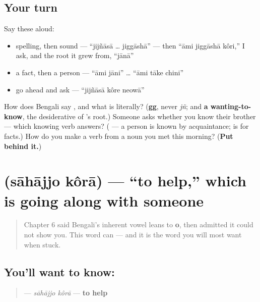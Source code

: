 \subsection*{Your turn}
Say these aloud:

\begin{itemize}
\raggedright
  \item spelling, then sound — \textquotedblleft{}jijñāsā … jiggāshā\textquotedblright{} — then \textquotedblleft{}āmi jiggāshā kôri,\textquotedblright{} I ask, and the root it grew from, \textquotedblleft{}jānā\textquotedblright{}
  \item a fact, then a person — \textquotedblleft{}āmi jāni\textquotedblright{} … \textquotedblleft{}āmi tāke chini\textquotedblright{}
  \item go ahead and ask — \textquotedblleft{}jijñāsā kôre neowā\textquotedblright{}
\end{itemize}

\begin{tcolorbox}[breakable,colback=teal!4,colframe=teal!35!black,title={Before you move on}]
How does Bengali say \textbf{}, and what is  literally? (\textbf{gg}, never \emph{jñ}; and \textbf{a wanting-to-know}, the desiderative of 's root.) Someone asks whether you know their brother — which knowing verb answers? (\textbf{} — a person is known by acquaintance;  is for facts.) How do you make a verb from a noun you met this morning? (\textbf{Put  behind it.})
\end{tcolorbox}
\section[sāhājjo kôrā]{  (sāhājjo kôrā) — \textquotedblleft{}to help,\textquotedblright{} which is going along with someone}

\label{lesson:BN-C09-sahajjo-kora}



\begin{quote}
Chapter 6 said Bengali's inherent vowel leans to \textbf{o}, then admitted it could not show you. This word can — and it is the word you will most want when stuck.
\end{quote}

\subsection*{You'll want to know:  }
\begin{quote}
\textbf{ } — \emph{sāhājjo kôrā} — \textbf{to help}
\end{quote}

